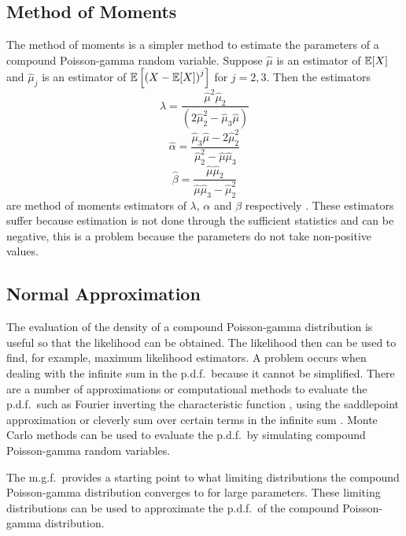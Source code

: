 \subsection{Method of Moments}

The method of moments is a simpler method to estimate the parameters of a compound Poisson-gamma random variable. Suppose $\widehat{\mu}$ is an estimator of $\operatorname{\mathbb{E}}[X]$ and $\widehat{\mu}_j$ is an estimator of $\operatorname{\mathbb{E}}\left[\left(X-\operatorname{\mathbb{E}}[X]\right)^j\right]$ for $j=2,3$. Then the estimators
\begin{equation}
  \widehat{\lambda}=\frac{\widehat{\mu}^2\widehat{\mu}_2}{\left(2\widehat{\mu}_2^2-\widehat{\mu}_3\widehat{\mu}\right)}
\end{equation}
\begin{equation}
  \widehat{\alpha}=\frac{\widehat{\mu}_3\widehat{\mu}-2\widehat{\mu}_2^2}{\widehat{\mu}_2^2-\widehat{\mu}\widehat{\mu}_3}
\end{equation}
\begin{equation}
  \widehat{\beta}=\frac{\widehat{\mu}\widehat{\mu}_2}{\widehat{\mu}\widehat{\mu}_3-\widehat{\mu}_2^2}
\end{equation}
are method of moments estimators of $\lambda$, $\alpha$ and $\beta$ respectively \citep{withers2011compound}. These estimators suffer because estimation is not done through the sufficient statistics and can be negative, this is a problem because the parameters do not take non-positive values.

\subsection{Normal Approximation}

The evaluation of the density of a compound Poisson-gamma distribution is useful so that the likelihood can be obtained. The likelihood then can be used to find, for example, maximum likelihood estimators. A problem occurs when dealing with the infinite sum in the p.d.f.~because it cannot be simplified. There are a number of approximations or computational methods to evaluate the p.d.f.~such as Fourier inverting the characteristic function \citep{dunn2008evaluation}, using the saddlepoint approximation \citep{daniels1954saddlepoint} or cleverly sum over certain terms in the infinite sum \citep{dunn2005series}. Monte Carlo methods can be used to evaluate the p.d.f.~by simulating compound Poisson-gamma random variables.

The m.g.f.~provides a starting point to what limiting distributions the compound Poisson-gamma distribution converges to for large parameters. These limiting distributions can be used to approximate the p.d.f.~of the compound Poisson-gamma distribution.

